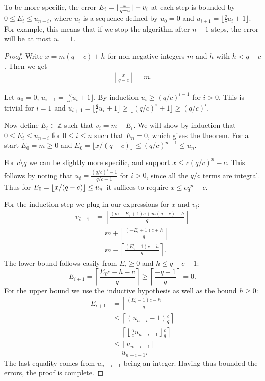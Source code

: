 To be more specific, the error $E_i = \lfloor {\frac{x}{q-c}} \rfloor - v_i$ at each step
is bounded by $0\le E_i\le u_{n-i}$,
where $u_i$ is a sequence defined by
$u_0=0$ and $u_{i+1} = \lfloor\frac{q}{c}u_i+1\rfloor$.
For example, this means that if we stop the algorithm after $n-1$ steps, the error will be at most $u_1=1$.
\begin{proof}
   Write $x = m(q-c)+h$ for non-negative integers $m$ and $h$ with $h<q-c$.
   Then we get
   \begin{align*}
      \left\lfloor\frac{x}{q-c}\right\rfloor = m.
      \label{eq:floor}
   \end{align*}

   Let $u_0=0$, $u_{i+1} = \lfloor\frac{q}{c}u_i+1\rfloor$.
   By induction $u_i \ge (q/c)^{i-1}$ for $i>0$.
   This is trivial for $i=1$ and $u_{i+1}=\lfloor \frac qc u_i +1\rfloor \ge \lfloor (q/c)^i + 1 \rfloor \ge (q/c)^i$.

   Now define $E_i\in\mathbb Z$ such that $v_i = m - E_i$.
   We will show by induction that $0\le E_{i} \le u_{n-i}$ for $0\le i\le n$ such that $E_n = 0$, which gives the theorem.
   For a start $E_0=m\ge 0$ and $E_0 = \lfloor x/(q-c)\rfloor \le (q/c)^{n-1} \le u_n$.

   For $c\setminus q$ we can be slightly more specific, and support $x \le c (q/c)^n-c$.
   This follows by noting that $u_i = \frac{(q/c)^i-1}{q/c-1}$ for $i>0$, since all the $q/c$ terms are integral.
   Thus for $E_0=\lfloor {x/(q-c)} \rfloor\le u_n$ it suffices to require $x\le c q^n-c$.

   For the induction step we plug in our expressions for $x$ and $v_i$:
   \begin{align*}
      v_{i+1}
      &= \left\lfloor \frac{(m-E_i+1)c+m(q-c)+h}{q}\right\rfloor
    \\&=
    m
    +
    \left\lfloor \frac{(- E_i+1)c +h}{q}\right\rfloor
    \\&=
    m
    - \left\lceil \frac{(E_i-1)c - h}{q}\right\rceil.
   \end{align*}
   The lower bound follows easily from $E_i \ge 0$ and $h\le q-c-1$:
   $$E_{i+1} = \left\lceil \frac{E_ic - h - c}{q}\right\rceil \ge
   \left\lceil \frac{- q + 1}{q}\right\rceil = 0.$$
   For the upper bound we use the inductive hypothesis as well as the bound $h\ge 0$:
   \begin{align*}
      E_{i+1}
      &= \left\lceil \frac{(E_i-1)c - h}{q}\right\rceil
    \\&\le\left\lceil (u_{n-i}-1)\frac{c}{q}\right\rceil
    \\&= \left\lceil \left\lfloor \frac{q}{c}u_{n-i-1} \right\rfloor \frac{c}{q}\right\rceil
    \\&\le \left\lceil u_{n-i-1}\right\rceil
    \\&= u_{n-i-1}.
   \end{align*}
   The last equality comes from $u_{n-i-1}$ being an integer.
   Having thus bounded the errors, the proof is complete.
\end{proof}
